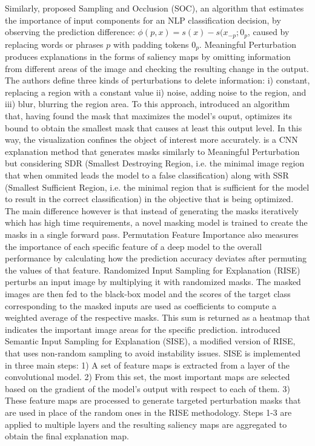 \documentclass[journal]{IEEEtran}
\begin{document}
Similarly, \cite{Jin2019} proposed Sampling and Occlusion (SOC), an algorithm that estimates the importance of input components for an NLP classification decision, by observing the prediction difference: $\phi(p,x)=s(x)-s(x_{-p};0_p$, caused by replacing words or phrases $p$ with padding tokens $0_p$.
Meaningful Perturbation \cite{Fong2017} produces explanations in the forms of saliency maps by omitting information from different areas of the image and checking the resulting change in the output. The authors define three kinds of perturbations to delete information: i) constant, replacing a region with a constant value ii) noise, adding noise to the region, and iii) blur, blurring the region area. 
To this approach, \cite{Fong2019} introduced an algorithm that, having found the mask that maximizes the model's ouput, optimizes its bound to obtain the smallest mask that causes at least this output level. In this way, the visualization confines the object of interest more accurately.
\cite{Dabkowski2017} is a CNN explanation method that generates masks similarly to Meaningful Perturbation but considering SDR (Smallest Destroying Region, i.e. the minimal image region that when ommited leads the model to a false classification) along with SSR (Smallest Sufficient Region, i.e. the minimal region that is sufficient for the model to result in the correct classification) in the objective that is being optimized. The main difference however is that instead of generating the masks iteratively which has high time requirements, a novel masking model is trained to create the masks in a single forward pass.
Permutation Feature Importance \cite{Altmann2010} also measures the importance of each specific feature of a deep model to the overall performance by calculating how the prediction accuracy deviates after permuting the values of that feature. 
Randomized Input Sampling for Explanation (RISE) \cite{Petsiuk2018} perturbs an input image by multiplying it with randomized masks. The masked images are then fed to the black-box model and the scores of the target class corresponding to the masked inputs are used as coefficients to compute a weighted average of the respective masks. This sum is returned as a heatmap that indicates the important image areas for the specific prediction.
\cite{Sattarzadeh2020} introduced Semantic Input Sampling for Explanation (SISE), a modified version of RISE, that uses non-random sampling to avoid instability issues. SISE is implemented in three main steps: 1) A set of feature maps is extracted from a layer of the convolutional model. 2) From this set, the most important maps are selected based on the gradient of the model's output with respect to each of them. 3) These feature maps are processed to generate targeted perturbation masks that are used in place of the random ones in the RISE methodology. Steps 1-3 are applied to multiple layers and the resulting saliency maps are aggregated to obtain the final explanation map.
\end{document}
